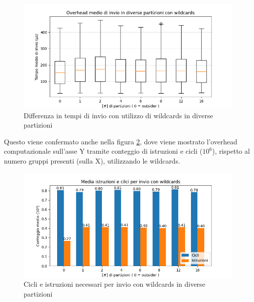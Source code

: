\begin{figure}[H]
    \centering
    \includegraphics[width=\textwidth]{./results/test2_wildcards.png}

    \caption{Differenza in tempi di invio con utilizzo di wildcards in diverse partizioni}\label{fig:test2wildcards}
\end{figure}
Questo viene confermato anche nella figura \ref{fig:test2cicl}, dove viene mostrato l'overhead computazionale sull'asse Y tramite conteggio di istruzioni e cicli ($10^6$), rispetto al numero gruppi presenti (sulla X), utilizzando le wildcards.
\begin{figure}[H]
    \centering
    \includegraphics[width=\textwidth]{./results/test2_cyclinstr.png}
    \caption{Cicli e istruzioni necessari per invio con wildcards in diverse partizioni}\label{fig:test2cicl}
\end{figure}




